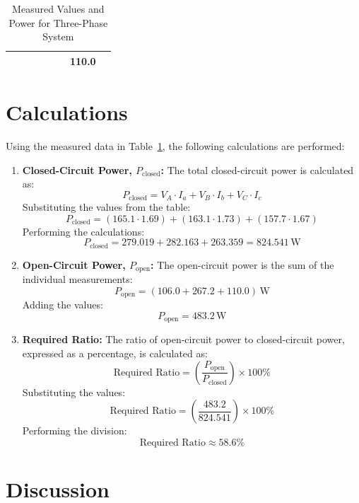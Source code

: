 \documentclass[a4paper,12pt]{article}
\begin{document}
\begin{table}[h!]
\begin{tabular}{|c|c|c|c|c|c|c|c|}
		&                                                          &                                                       &                                                     &                                                     &                                                     & 110.0                                                               &                                                                   \\ \hline
	\end{tabular}
	\caption{Measured Values and Power for Three-Phase System}
	\label{tab:three_phase_system}
\end{table}
\section{Calculations}

Using the measured data in Table~\ref{tab:three_phase_system}, the following calculations are performed:

\begin{enumerate}
	\item \textbf{Closed-Circuit Power, $P_{\text{closed}}$:}  
	The total closed-circuit power is calculated as:
	\[
	P_{\text{closed}} = V_{A} \cdot I_a + V_{B} \cdot I_b + V_{C} \cdot I_c
	\]
	Substituting the values from the table:
	\[
	P_{\text{closed}} = (165.1 \cdot 1.69) + (163.1 \cdot 1.73) + (157.7 \cdot 1.67)
	\]
	Performing the calculations:
	\[
	P_{\text{closed}} = 279.019 + 282.163 + 263.359 = 824.541 \, \text{W}
	\]
	
	\item \textbf{Open-Circuit Power, $P_{\text{open}}$:}  
	The open-circuit power is the sum of the individual measurements:
	\[
	P_{\text{open}} = (106.0 + 267.2 + 110.0) \, \text{W}
	\]
	Adding the values:
	\[
	P_{\text{open}} = 483.2 \, \text{W}
	\]
	
	\item \textbf{Required Ratio:}  
	The ratio of open-circuit power to closed-circuit power, expressed as a percentage, is calculated as:
	\[
	\text{Required Ratio} = \left( \frac{P_{\text{open}}}{P_{\text{closed}}} \right) \times 100\%
	\]
	Substituting the values:
	\[
	\text{Required Ratio} = \left( \frac{483.2}{824.541} \right) \times 100\%
	\]
	Performing the division:
	\[
	\text{Required Ratio} \approx 58.6\%
	\]
\end{enumerate}

	\newpage
\section{Discussion}
\end{document}
